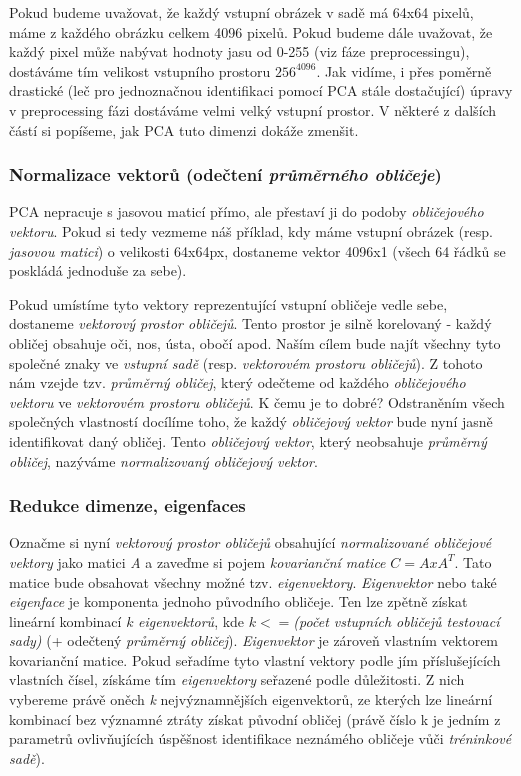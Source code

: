 \documentclass[10pt,a4paper]{article}
\begin{document}
Pokud budeme uvažovat, že každý vstupní obrázek v sadě má 64x64 pixelů, máme z každého obrázku celkem 4096 pixelů. Pokud budeme dále uvažovat, že každý pixel může nabývat hodnoty jasu od 0-255 (viz fáze preprocessingu), dostáváme tím velikost
vstupního prostoru $256^{4096}$. Jak vidíme, i přes poměrně drastické (leč pro jednoznačnou identifikaci pomocí PCA
stále dostačující) úpravy v preprocessing fázi dostáváme velmi velký vstupní prostor. V některé z dalších částí
si popíšeme, jak PCA tuto dimenzi dokáže zmenšit.

\subsubsection*{Normalizace vektorů (odečtení \textit{průměrného obličeje})}

PCA nepracuje s jasovou maticí přímo, ale přestaví ji do podoby \textit{obličejového vektoru}. Pokud si tedy vezmeme náš
příklad, kdy máme vstupní obrázek (resp. \textit{jasovou matici}) o velikosti 64x64px, dostaneme vektor 4096x1 (všech 
64 řádků se poskládá jednoduše za sebe).

Pokud umístíme tyto vektory reprezentující vstupní obličeje vedle sebe, dostaneme \textit{vektorový prostor obličejů}.
Tento prostor je silně korelovaný - každý obličej obsahuje oči, nos, ústa, obočí apod. Naším cílem bude najít všechny
tyto společné znaky ve \textit{vstupní sadě} (resp. \textit{vektorovém prostoru obličejů}). Z tohoto nám vzejde
tzv. \textit{průměrný obličej}, který odečteme od každého \textit{obličejového vektoru} ve \textit{vektorovém prostoru obličejů}. K čemu je to dobré? Odstraněním všech společných vlastností docílíme toho, že každý \textit{obličejový vektor}
bude nyní jasně identifikovat daný obličej. Tento \textit{obličejový vektor}, který neobsahuje \textit{průměrný obličej}, nazýváme \textit{normalizovaný obličejový vektor}.

\subsubsection*{Redukce dimenze, eigenfaces}

Označme si nyní \textit{vektorový prostor obličejů} obsahující \textit{normalizované obličejové vektory} jako matici
\textit{A} a zaveďme si pojem \textit{kovarianční matice} $C=AxA^T$. Tato matice bude obsahovat všechny možné tzv.
\textit{eigenvektory}. \textit{Eigenvektor} nebo také \textit{eigenface} je komponenta jednoho původního obličeje. 
Ten lze zpětně získat lineární kombinací $k$ \textit{eigenvektorů}, kde $k<=$\textit{(počet vstupních obličejů testovací sady)} (+ odečtený \textit{průměrný obličej}). \textit{Eigenvektor} je zároveň vlastním vektorem kovarianční matice. Pokud seřadíme tyto vlastní vektory podle
jím příslušejících vlastních čísel, získáme tím \textit{eigenvektory} seřazené podle důležitosti. Z nich vybereme právě
oněch \textit{k} nejvýznamnějších eigenvektorů, ze kterých lze lineární kombinací bez významné ztráty získat původní
obličej (právě číslo k je jedním z parametrů ovlivňujících úspěšnost identifikace neznámého obličeje vůči
\textit{tréninkové sadě}).
\end{document}
